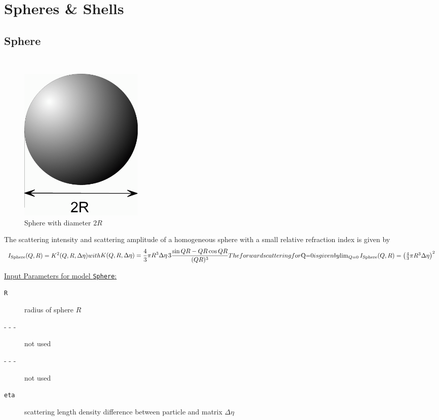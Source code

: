 \section{Spheres \& Shells}
\label{sect:Spheres_Shells}

\subsection{Sphere}
\label{sect:sphere} ~\\

\begin{figure}[htb]
\begin{center}
\includegraphics[width=0.2875\textwidth]{../images/form_factor/spheres/sphere.png}
\end{center}
\caption{Sphere with diameter $2R$} \label{fig:Sketch_sphere}
\end{figure}
The scattering intensity and scattering amplitude of a homogeneous sphere with a small relative refraction index is given by \cite{Rayleigh1914}
\begin{subequations}
\begin{align}
I_\text{Sphere}(Q,R) = K^2(Q,R,\Delta\eta) \label{eq:I_sphere}
\end{align}
with
\begin{align}
 K(Q,R,\Delta\eta) = \frac{4}{3}\pi R^3 \Delta\eta \, 3 \frac{\sin QR - QR \cos QR}{(QR)^3}
\end{align}
The forward scattering for $Q=0$ is given by
$$
\lim_{Q=0}I_\text{Sphere}(Q,R) =\left( \frac{4}{3}\pi R^3 \Delta\eta \right)^2
$$
\end{subequations}

\vspace{5mm}
\noindent \uline{Input Parameters for model \texttt{Sphere}:}
\begin{description}
\item[\texttt{R}] radius of sphere $R$
\item[- - -] not used
\item[- - -] not used
\item[\texttt{eta}] scattering length density difference between particle and matrix $\Delta\eta$
\end{description}

